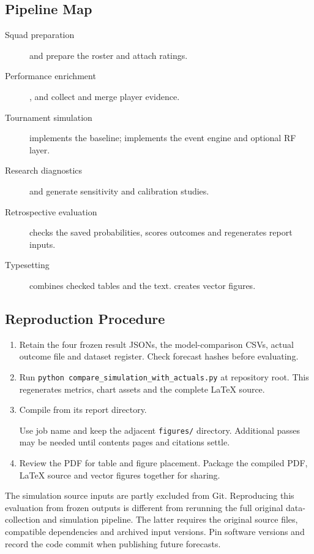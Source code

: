\subsection{Pipeline Map}
{\small
\begin{description}
\item[Squad preparation]  and
 prepare the roster and attach ratings.
\item[Performance enrichment]\hfill\break {},
 and
 collect and merge player evidence.
\item[Tournament simulation]  implements the baseline;
 implements the event engine and optional RF layer.
\item[Research diagnostics]  and
 generate sensitivity and calibration studies.
\item[Retrospective evaluation]  checks the
saved probabilities, scores outcomes and regenerates report inputs.
\item[Typesetting]  combines checked tables and the
 text.  creates vector figures.
\end{description}
}
\subsection{Reproduction Procedure}
\begin{enumerate}
\item Retain the four frozen result JSONs, the model-comparison CSVs, actual
outcome file and dataset register. Check forecast hashes before evaluating.
\item Run \texttt{python compare\_simulation\_with\_actuals.py} at repository root.
This regenerates metrics, chart assets and the complete LaTeX source.
\item Compile  from its report directory.\par
Use job name  and keep the adjacent
\texttt{figures/} directory. Additional passes may be needed
until contents pages and citations settle.
\item Review the PDF for table and figure placement. Package the compiled PDF,
LaTeX source and vector figures together for sharing.
\end{enumerate}
The simulation source inputs are partly excluded from Git. Reproducing this
evaluation from frozen outputs is different from rerunning the full original
data-collection and simulation pipeline. The latter requires the original source
files, compatible dependencies and archived input versions. Pin software
versions and record the code commit when publishing future forecasts.
